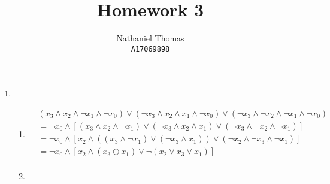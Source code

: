 \documentclass{article}
\title{Homework 3}
\author{
	Nathaniel Thomas\\
	\texttt{A17069898}
}
\newcommand*\xor{\oplus}
\begin{document}
\maketitle

\begin{enumerate}
	\item \begin{enumerate}
		      \item
		            \begin{align*}
			             & (x_3 \land x_2 \land \lnot x_1 \land \lnot x_0) \lor
			            (\lnot x_3 \land x_2 \land x_1 \land \lnot x_0) \lor
			            (\lnot x_3 \land \lnot x_2 \land \lnot x_1 \land \lnot x_0) \\
			             & = \lnot x_0 \land \left[
				            (x_3 \land x_2 \land \lnot x_1  ) \lor
				            (\lnot x_3 \land x_2 \land x_1  ) \lor
				            (\lnot x_3 \land \lnot x_2 \land \lnot x_1 )
			            \right]                                                     \\
			             & = \lnot x_0 \land \left[
				            x_2 \land ( (x_3 \land \lnot x_1) \lor (\lnot x_3 \land x_1) ) \lor
				            (\lnot x_2 \land \lnot x_3 \land \lnot x_1 )
			            \right]                                                     \\
			             & = \lnot x_0 \land \left[
				            x_2 \land (x_3 \xor x_1) \lor
				            \lnot (x_2 \lor  x_3 \lor x_1 )
			            \right]                                                     \\
		            \end{align*}

		      \item ~


\end{enumerate}
\end{enumerate}
\end{document}
